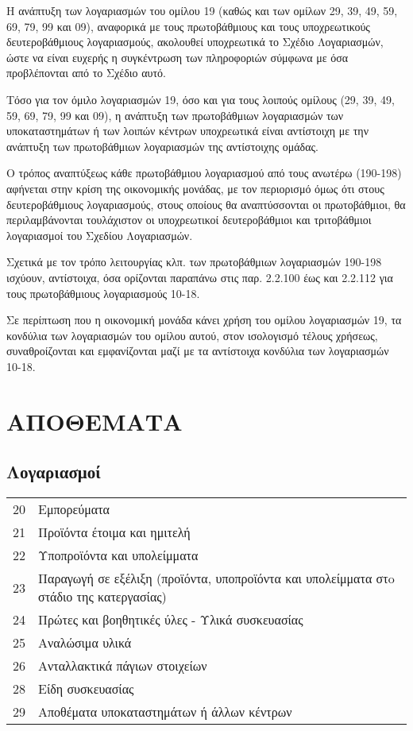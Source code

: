 \documentclass[A4,10pt,greek]{book}
\begin{document}
Η ανάπτυξη των λογαριασμών του ομίλου 19 (καθώς και των ομίλων 29, 39, 49, 59, 69, 79, 99 και 09), αναφορικά με τους πρωτοβάθμιους και τους υποχρεωτικούς δευτεροβάθμιους λογαριασμούς, ακολουθεί υποχρεωτικά το Σχέδιο Λογαριασμών, ώστε να είναι ευχερής η συγκέντρωση των πληροφοριών σύμφωνα με όσα προβλέπονται από το Σχέδιο αυτό.

Τόσο για τον όμιλο λογαριασμών 19, όσο και για τους λοιπούς ομίλους (29, 39, 49, 59, 69, 79, 99 και 09), η ανάπτυξη των πρωτοβάθμιων λογαριασμών των υποκαταστημάτων ή των λοιπών κέντρων υποχρεωτικά είναι αντίστοιχη με την ανάπτυξη των πρωτοβάθμιων λογαριασμών της αντίστοιχης ομάδας.

Ο τρόπος αναπτύξεως κάθε πρωτοβάθμιου λογαριασμού από τους ανωτέρω (190-198) αφήνεται στην κρίση της οικονομικής μονάδας, με τον περιορισμό όμως ότι στους δευτεροβάθμιους λογαριασμούς, στους οποίους θα αναπτύσσονται οι πρωτοβάθμιοι, θα περιλαμβάνονται τουλάχιστον οι υποχρεωτικοί δευτεροβάθμιοι και τριτοβάθμιοι λογαριασμοί του Σχεδίου Λογαριασμών.

Σχετικά με τον τρόπο λειτουργίας κλπ. των πρωτοβάθμιων λογαριασμών 190-198 ισχύουν, αντίστοιχα, όσα ορίζονται παραπάνω στις παρ. 2.2.100 έως και 2.2.112 για τους πρωτοβάθμιους λογαριασμούς 10-18.

Σε περίπτωση που η οικονομική μονάδα κάνει χρήση του ομίλου λογαριασμών 19, τα κονδύλια των λογαριασμών του ομίλου αυτού, στον ισολογισμό τέλους χρήσεως, συναθροίζονται και εμφανίζονται μαζί με τα αντίστοιχα κονδύλια των λογαριασμών 10-18.

\chapter{ΑΠΟΘΕΜΑΤΑ}

\section{Λογαριασμοί}

\begin{tabularx}{\linewidth}{lX}

20 & Εμπορεύματα\\
21 & Προϊόντα έτοιμα και ημιτελή\\
22 & Υποπροϊόντα και υπολείμματα\\
23 & Παραγωγή σε εξέλιξη (προϊόντα, υποπροϊόντα και υπολείμματα στo στάδιο της κατεργασίας)\\
24 & Πρώτες και βοηθητικές ύλες - Υλικά συσκευασίας\\
25 & Αναλώσιμα υλικά\\
26 & Ανταλλακτικά πάγιων στοιχείων\\
28 & Είδη συσκευασίας\\
29 & Αποθέματα υποκαταστημάτων ή άλλων κέντρων\\

\end{tabularx}
\end{document}
